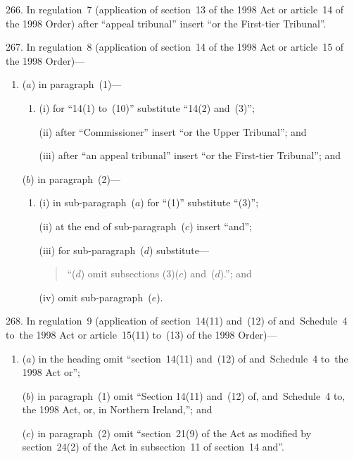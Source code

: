 \documentclass[12pt,a4paper]{article}
\begin{document}
\medskip

266.  In regulation~7 (application of section~13 of the 1998 Act or article~14 of the 1998 Order) after “appeal tribunal” insert “or the First-tier Tribunal”.

\medskip

267.  In regulation~8 (application of section~14 of the 1998 Act or article~15 of the 1998 Order)—
\begin{enumerate}\item[]
($a$) in paragraph~(1)—
\begin{enumerate}\item[]
(i) for “14(1) to~(10)” substitute “14(2) and~(3)”;

(ii) after “Commissioner” insert “or the Upper Tribunal”; and

(iii) after “an appeal tribunal” insert “or the First-tier Tribunal”; and
\end{enumerate}

($b$) in paragraph~(2)—
\begin{enumerate}\item[]
(i) in sub-paragraph~($a$)  for “(1)” substitute “(3)”;

(ii) at the end of sub-paragraph~($c$)  insert “and”;

(iii) for sub-paragraph~($d$)  substitute—
\begin{quotation}
“($d$) omit subsections (3)($c$)  and~($d$).”; and
\end{quotation}

(iv) omit sub-paragraph~($e$).
\end{enumerate}
\end{enumerate}

\medskip

268.  In regulation~9 (application of section~14(11) and~(12) of and~Schedule~4 to~the 1998 Act or article~15(11) to~(13) of the 1998 Order)—
\begin{enumerate}\item[]
($a$) in the heading omit “section~14(11) and~(12) of and~Schedule~4 to~the 1998 Act or”;

($b$) in paragraph~(1) omit “Section 14(11) and~(12) of, and~Schedule~4 to, the 1998 Act, or, in Northern Ireland,”; and

($c$) in paragraph~(2) omit “section~21(9) of the Act as modified by section~24(2) of the Act in subsection~11 of section~14 and”.
\end{enumerate}

\medskip
\end{document}
